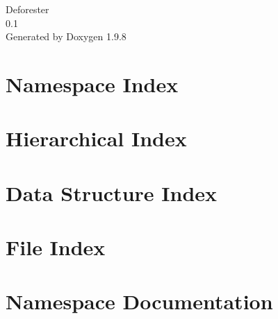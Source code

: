 \documentclass[twoside]{book}
\newcommand{\+}{\discretionary{\mbox{\scriptsize$\hookleftarrow$}}{}{}}
\newcommand{\clearemptydoublepage}{%
    \newpage{\pagestyle{empty}\cleardoublepage}%
  }
\begin{document}
  \raggedbottom
    \hypersetup{pageanchor=false,
                bookmarksnumbered=true,
                pdfencoding=unicode
               }
  \begin{titlepage}
  \vspace*{7cm}
  \begin{center}%
  {\Large Deforester}\\
  [1ex]\large 0.\+1 \\
  \vspace*{1cm}
  {\large Generated by Doxygen 1.9.8}\\
  \end{center}
  \end{titlepage}
  \clearemptydoublepage
  \tableofcontents
  \clearemptydoublepage
  \hypersetup{pageanchor=true}
\chapter{Namespace Index}

\chapter{Hierarchical Index}

\chapter{Data Structure Index}

\chapter{File Index}

\chapter{Namespace Documentation}





\end{document}
